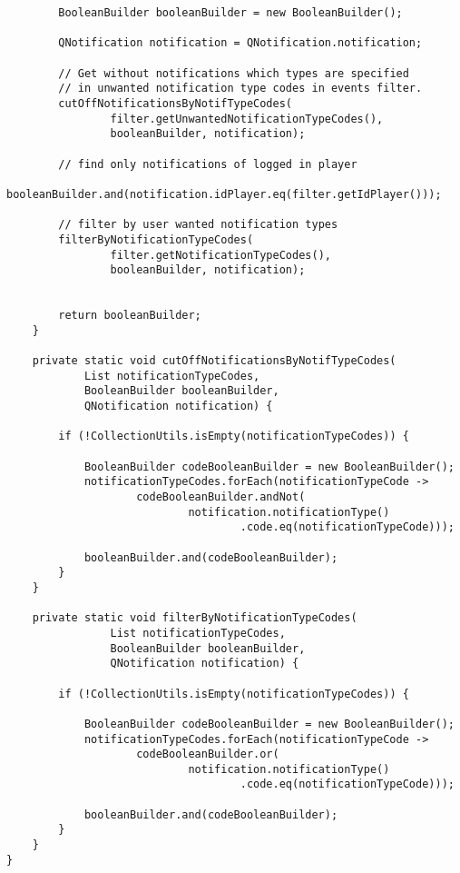 \documentclass[twoside, 12pt]{article}
\begin{document}
{{\begin{lstlisting}
        BooleanBuilder booleanBuilder = new BooleanBuilder();

        QNotification notification = QNotification.notification;

        // Get without notifications which types are specified
        // in unwanted notification type codes in events filter.
        cutOffNotificationsByNotifTypeCodes(
                filter.getUnwantedNotificationTypeCodes(),
                booleanBuilder, notification);

        // find only notifications of logged in player
        booleanBuilder.and(notification.idPlayer.eq(filter.getIdPlayer()));

        // filter by user wanted notification types
        filterByNotificationTypeCodes(
                filter.getNotificationTypeCodes(),
                booleanBuilder, notification);


        return booleanBuilder;
    }

    private static void cutOffNotificationsByNotifTypeCodes(
            List notificationTypeCodes,
            BooleanBuilder booleanBuilder,
            QNotification notification) {

        if (!CollectionUtils.isEmpty(notificationTypeCodes)) {

            BooleanBuilder codeBooleanBuilder = new BooleanBuilder();
            notificationTypeCodes.forEach(notificationTypeCode ->
                    codeBooleanBuilder.andNot(
                            notification.notificationType()
                                    .code.eq(notificationTypeCode)));

            booleanBuilder.and(codeBooleanBuilder);
        }
    }

    private static void filterByNotificationTypeCodes(
                List notificationTypeCodes,
                BooleanBuilder booleanBuilder,
                QNotification notification) {

        if (!CollectionUtils.isEmpty(notificationTypeCodes)) {

            BooleanBuilder codeBooleanBuilder = new BooleanBuilder();
            notificationTypeCodes.forEach(notificationTypeCode ->
                    codeBooleanBuilder.or(
                            notification.notificationType()
                                    .code.eq(notificationTypeCode)));

            booleanBuilder.and(codeBooleanBuilder);
        }
    }
}
\end{lstlisting}

}}
\end{document}
